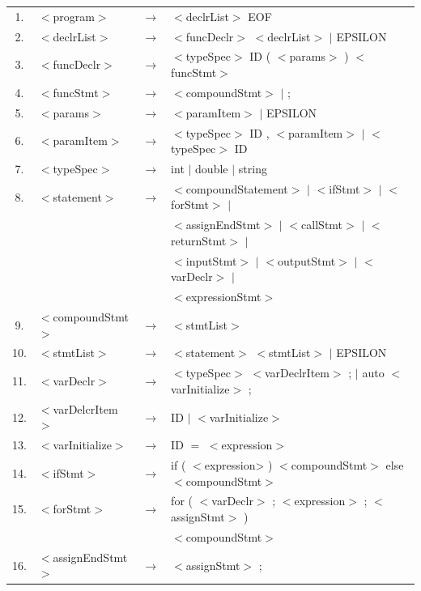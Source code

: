 \documentclass[a4paper, 11pt, titlepage]{article}
\begin{document}
\begin{table}[h]
	\begin{center}
	\begin{tabular}{|c| l c l|}	\hline
	1. 	& $<$program$>$       &$ \rightarrow $& $<$declrList$>$ EOF \\
	2. 	& $<$declrList$>$     &$ \rightarrow $& $<$funcDeclr$>$ $<$declrList$>$ $|$ EPSILON \\
	3. 	& $<$funcDeclr$>$     &$ \rightarrow $& $<$typeSpec$>$ ID ( $<$params$>$ ) $<$funcStmt$>$ \\
	4. 	& $<$funcStmt$>$      &$ \rightarrow $& $<$compoundStmt$>$ $|$ ; \\
	5. 	& $<$params$>$        &$ \rightarrow $& $<$paramItem$>$ $|$ EPSILON \\
	6. 	& $<$paramItem$>$     &$ \rightarrow $& $<$typeSpec$>$ ID , $<$paramItem$>$ $|$ $<$typeSpec$>$ ID \\
	7. 	& $<$typeSpec$>$      &$ \rightarrow $& int $|$ double $|$ string \\
	8. 	& $<$statement$>$     &$ \rightarrow $& $<$compoundStatement$>$ $|$ $<$ifStmt$>$ $|$ $<$forStmt$>$ $|$ \\ 	
		& 					  & 			  & $<$assignEndStmt$>$ $|$ $<$callStmt$>$ $|$ $<$returnStmt$>$ $|$ \\  
		&					  &				  & $<$inputStmt$>$ $|$ $<$outputStmt$>$ $|$ $<$varDeclr$>$ $|$ \\ 
		& 					  & 			  &$<$expressionStmt$>$ \\
	9.  & $<$compoundStmt$>$  &$ \rightarrow $& { $<$stmtList$>$ } \\
	10. & $<$stmtList$>$      &$ \rightarrow $& $<$statement$>$ $<$stmtList$>$ $|$ EPSILON \\
	11. & $<$varDeclr$>$      &$ \rightarrow $& $<$typeSpec$>$ $<$varDeclrItem$>$ ; $|$ auto $<$varInitialize$>$ ; \\
	12. & $<$varDelcrItem$>$  &$ \rightarrow $& ID $|$ $<$varInitialize$>$ \\
	13. & $<$varInitialize$>$ &$ \rightarrow $& ID $=$ $<$expression$>$ \\
	14. & $<$ifStmt$>$        &$ \rightarrow $& if ( $<$expression> ) $<$compoundStmt$>$ else $<$compoundStmt$>$ \\
	15. & $<$forStmt$>$       &$ \rightarrow $& for ( $<$varDeclr$>$ ; $<$expression$>$ ; $<$assignStmt$>$ ) \\ 
		& 					  & 			  & $<$compoundStmt$>$ \\
	16. & $<$assignEndStmt$>$ &$ \rightarrow $& $<$assignStmt$>$ ; \\

\end{tabular}
\end{center}
\end{table}
\end{document}

